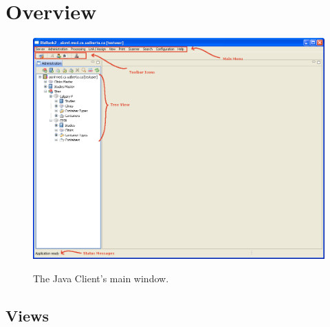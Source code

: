 \chapter{Overview}
    \begin{figure}[H]
      \centering
      \scalebox{0.5}
      { \includegraphics*{screenshots/overview/main_window} }
      \caption{The Java Client's main window.}
      \label{fig:main_window}
    \end{figure}
\section{Views}
